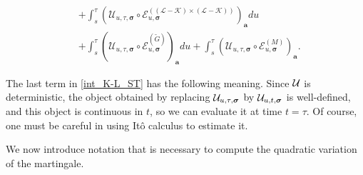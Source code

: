 \begin{lemma}
\begin{align}
    &+ \int_{s}^\tau \left(\mathcal{U}_{u, \tau, \boldsymbol{\sigma}} \circ \mathcal{E}^{((\mathcal{L} - \mathcal{K}) \times (\mathcal{L} - \mathcal{K}))}_{u, \boldsymbol{\sigma}}\right)_{\textbf{a}} du  \nonumber \\
    &+ \int_{s}^\tau \left(\mathcal{U}_{u, \tau, \boldsymbol{\sigma}} \circ \mathcal{E}^{(\widetilde{G})}_{u, \boldsymbol{\sigma}}\right)_{\textbf{a}} du + \int_{s}^\tau \left(\mathcal{U}_{u, \tau, \boldsymbol{\sigma}} \circ \mathcal{E}^{(M)}_{u, \boldsymbol{\sigma}}\right)_{\textbf{a}}.
\end{align}

 
\end{lemma}

The last term in \eqref{int_K-L_ST} has the following meaning. Since ${\cal U}$ is deterministic, the object obtained by replacing ${\cal U}_{u,\tau,\boldsymbol{\sigma}}$ by ${\cal U}_{u,t,\boldsymbol{\sigma}}$ is well-defined, and this object is continuous in $t$, so we can evaluate it at time $t=\tau$. Of course, one must be careful in using It\^{o} calculus to estimate it.

We now introduce notation that is necessary to compute the quadratic variation of the martingale.

